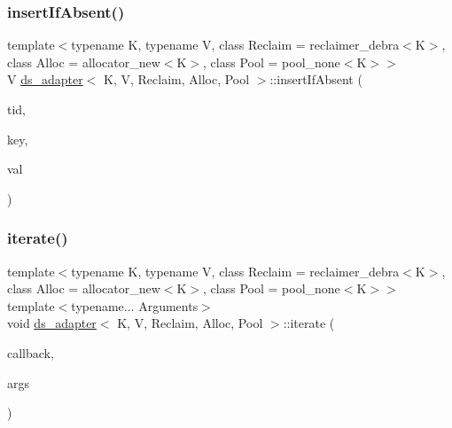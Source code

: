 \subsubsection{\texorpdfstring{insert\+If\+Absent()}{insertIfAbsent()}\hspace{0.1cm}{\footnotesize\ttfamily [26/26]}}
{\footnotesize\ttfamily template$<$typename K, typename V, class Reclaim = reclaimer\+\_\+debra$<$\+K$>$, class Alloc = allocator\+\_\+new$<$\+K$>$, class Pool = pool\+\_\+none$<$\+K$>$$>$ \\
V \hyperlink{classds__adapter}{ds\+\_\+adapter}$<$ K, V, Reclaim, Alloc, Pool $>$\+::insert\+If\+Absent (\begin{DoxyParamCaption}\item[{const int}]{tid,  }\item[{const K \&}]{key,  }\item[{const V \&}]{val }\end{DoxyParamCaption})\hspace{0.3cm}{\ttfamily [inline]}}

\mbox{\label{classds__adapter_ab1e0bb9a9b403ba68e85bf53219b1368}} 
\subsubsection{\texorpdfstring{iterate()}{iterate()}\hspace{0.1cm}{\footnotesize\ttfamily [1/5]}}
{\footnotesize\ttfamily template$<$typename K, typename V, class Reclaim = reclaimer\+\_\+debra$<$\+K$>$, class Alloc = allocator\+\_\+new$<$\+K$>$, class Pool = pool\+\_\+none$<$\+K$>$$>$ \\
template$<$typename... Arguments$>$ \\
void \hyperlink{classds__adapter}{ds\+\_\+adapter}$<$ K, V, Reclaim, Alloc, Pool $>$\+::iterate (\begin{DoxyParamCaption}\item[{void($\ast$)(K key, V value, Arguments... args)}]{callback,  }\item[{Arguments...}]{args }\end{DoxyParamCaption})\hspace{0.3cm}{\ttfamily [inline]}}

\mbox{\label{classds__adapter_ab1e0bb9a9b403ba68e85bf53219b1368}} 
